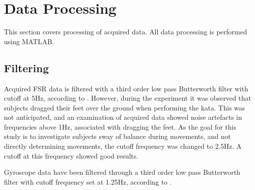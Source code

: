 \section{Data Processing}
This section covers processing of acquired data. All data processing is performed using MATLAB. 

\subsection{Filtering} \label{subsec:filtering}


Acquired FSR data is filtered with a third order low pass Butterworth filter with cutoff at 5Hz, according to \cite{Prieto1996}. 
However, during the experiment it was observed that subjects dragged their feet over the ground when performing the kata. This was not anticipated, and an examination of acquired data showed noise artefacts in frequencies above 1Hz, associated with dragging the feet. As the goal for this study is to investigate subjects sway of balance during movements, and not directly determining movements, the cutoff frequency was changed to 2.5Hz. A cutoff at this frequency showed good results.

Gyroscope data have been filtered through a third order low pass Butterworth filter with cutoff frequency set at 1.25Hz, according to \cite{Alberts2015}. 




